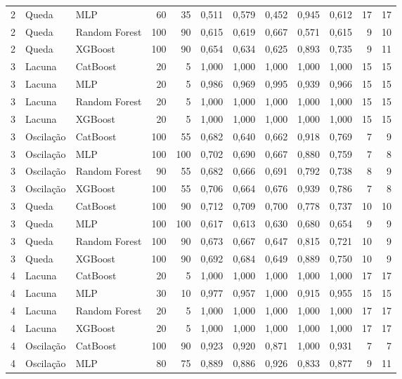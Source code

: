 \begin{longtable}{@{}rllrrrrrrrrr@{}}
2 & Queda & MLP & 60 & 35 & 0,511 & 0,579 & 0,452 & 0,945 & 0,612 & 17 & 17 \\
2 & Queda & Random Forest & 100 & 90 & 0,615 & 0,619 & 0,667 & 0,571 & 0,615 & 9 & 10 \\
2 & Queda & XGBoost & 100 & 90 & 0,654 & 0,634 & 0,625 & 0,893 & 0,735 & 9 & 11 \\
3 & Lacuna & CatBoost & 20 & 5 & 1,000 & 1,000 & 1,000 & 1,000 & 1,000 & 15 & 15 \\
3 & Lacuna & MLP & 20 & 5 & 0,986 & 0,969 & 0,995 & 0,939 & 0,966 & 15 & 15 \\
3 & Lacuna & Random Forest & 20 & 5 & 1,000 & 1,000 & 1,000 & 1,000 & 1,000 & 15 & 15 \\
3 & Lacuna & XGBoost & 20 & 5 & 1,000 & 1,000 & 1,000 & 1,000 & 1,000 & 15 & 15 \\
3 & Oscilação & CatBoost & 100 & 55 & 0,682 & 0,640 & 0,662 & 0,918 & 0,769 & 7 & 9 \\
3 & Oscilação & MLP & 100 & 100 & 0,702 & 0,690 & 0,667 & 0,880 & 0,759 & 7 & 8 \\
3 & Oscilação & Random Forest & 90 & 55 & 0,682 & 0,666 & 0,691 & 0,792 & 0,738 & 8 & 9 \\
3 & Oscilação & XGBoost & 100 & 55 & 0,706 & 0,664 & 0,676 & 0,939 & 0,786 & 7 & 8 \\
3 & Queda & CatBoost & 100 & 90 & 0,712 & 0,709 & 0,700 & 0,778 & 0,737 & 10 & 10 \\
3 & Queda & MLP & 100 & 100 & 0,617 & 0,613 & 0,630 & 0,680 & 0,654 & 9 & 9 \\
3 & Queda & Random Forest & 100 & 90 & 0,673 & 0,667 & 0,647 & 0,815 & 0,721 & 10 & 9 \\
3 & Queda & XGBoost & 100 & 90 & 0,692 & 0,684 & 0,649 & 0,889 & 0,750 & 10 & 9 \\
4 & Lacuna & CatBoost & 20 & 5 & 1,000 & 1,000 & 1,000 & 1,000 & 1,000 & 17 & 17 \\
4 & Lacuna & MLP & 30 & 10 & 0,977 & 0,957 & 1,000 & 0,915 & 0,955 & 15 & 15 \\
4 & Lacuna & Random Forest & 20 & 5 & 1,000 & 1,000 & 1,000 & 1,000 & 1,000 & 17 & 17 \\
4 & Lacuna & XGBoost & 20 & 5 & 1,000 & 1,000 & 1,000 & 1,000 & 1,000 & 17 & 17 \\
4 & Oscilação & CatBoost & 100 & 90 & 0,923 & 0,920 & 0,871 & 1,000 & 0,931 & 7 & 7 \\
4 & Oscilação & MLP & 80 & 75 & 0,889 & 0,886 & 0,926 & 0,833 & 0,877 & 9 & 11 \\

\end{longtable}
